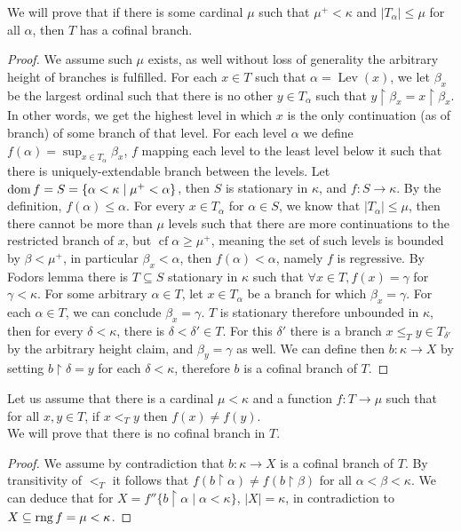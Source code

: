 \question{}
We will prove that if there is some cardinal $\mu$ such that $\mu^+ < \kappa$ and $|T_\alpha| \le \mu$ for all $\alpha$, then $T$ has a cofinal branch.
\begin{proof}
	We assume such $\mu$ exists, as well without loss of generality the arbitrary height of branches is fulfilled.
	For each $x \in T$ such that $\alpha = \operatorname{Lev}(x)$, we let $\beta_x$ be the largest ordinal such that there is no other $y \in T_\alpha$ such that $y \restriction \beta_x = x \restriction \beta_x$.
	In other words, we get the highest level in which $x$ is the only continuation (as of branch) of some branch of that level.
	For each level $\alpha$ we define $f(\alpha) = \sup_{x \in T_\alpha} \beta_x$, $f$ mapping each level to the least level below it such that there is uniquely-extendable branch between the levels.
	Let $\operatorname{dom} f = S = \{ \alpha < \kappa \mid \mu^+ < \alpha \}$, then $S$ is stationary in $\kappa$, and $f : S \to \kappa$.
	By the definition, $f(\alpha) \le \alpha$.
	For every $x \in T_\alpha$ for $\alpha \in S$, we know that $|T_\alpha| \le \mu$, then there cannot be more than $\mu$ levels such that there are more continuations to the restricted branch of $x$,
	but $\operatorname{cf} \alpha \ge \mu^+$, meaning the set of such levels is bounded by $\beta < \mu^+$, in particular $\beta_x < \alpha$, then $f(\alpha) < \alpha$, namely $f$ is regressive.
	By Fodors lemma there is $T \subseteq S$ stationary in $\kappa$ such that $\forall x \in T, f(x) = \gamma$ for $\gamma < \kappa$.
	For some arbitrary $\alpha \in T$, let $x \in T_\alpha$ be a branch for which $\beta_x = \gamma$.
	For each $\alpha \in T$, we can conclude $\beta_x = \gamma$.
	$T$ is stationary therefore unbounded in $\kappa$, then for every $\delta < \kappa$, there is $\delta < \delta' \in T$.
	For this $\delta'$ there is a branch $x \le_T y \in T_{\delta'}$ by the arbitrary height claim, and $\beta_y = \gamma$ as well.
	We can define then $b : \kappa \to X$ by setting $b \restriction \delta = y$ for each $\delta < \kappa$, therefore $b$ is a cofinal branch of $T$.
\end{proof}

\question{}
Let us assume that there is a cardinal $\mu < \kappa$ and a function $f : T \to \mu$ such that for all $x, y \in T$, if $x <_T y$ then $f(x) \ne f(y)$. \\
We will prove that there is no cofinal branch in $T$.
\begin{proof}
	We assume by contradiction that $b : \kappa \to X$ is a cofinal branch of $T$.
	By transitivity of $<_T$ it follows that $f(b \restriction \alpha) \ne f(b \restriction \beta)$ for all $\alpha < \beta < \kappa$.
	We can deduce that for $X = f '' \{ b \restriction \alpha \mid \alpha < \kappa \}$, $|X| = \kappa$, in contradiction to $X \subseteq \operatorname{rng} f = \mu < \kappa$.
\end{proof}

